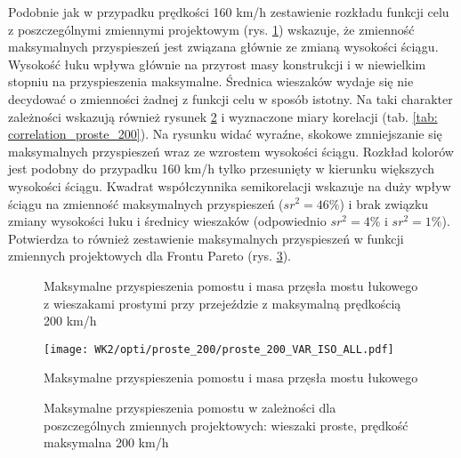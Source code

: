Podobnie jak w przypadku prędkości 160 km/h zestawienie rozkładu funkcji celu z poszczególnymi zmiennymi projektowym (rys. \ref{fig:wk2_opti_proste_200_variables}) wskazuje, że zmienność maksymalnych przyspieszeń jest związana głównie ze zmianą wysokości ściągu. Wysokość łuku wpływa głównie na przyrost masy konstrukcji i w niewielkim stopniu na przyspieszenia maksymalne. Średnica wieszaków wydaje się nie decydować o zmienności żadnej z funkcji celu w sposób istotny. Na taki charakter zależności wskazują również rysunek \ref{fig:wk2_opti_proste_200_vars_all} i wyznaczone miary korelacji (tab. \ref{tab: correlation_proste_200}). Na rysunku widać wyraźne, skokowe zmniejszanie się maksymalnych przyspieszeń wraz ze wzrostem wysokości ściągu. Rozkład kolorów jest podobny do przypadku 160 km/h tylko przesunięty w kierunku większych wysokości ściągu. Kwadrat współczynnika semikorelacji wskazuje na duży wpływ ściągu na zmienność maksymalnych przyspieszeń ($sr^2=46\%$) i brak związku zmiany wysokości łuku i średnicy wieszaków (odpowiednio $sr^2=4\%$ i $sr^2=1\%$). Potwierdza to również zestawienie maksymalnych przyspieszeń w funkcji zmiennych projektowych dla Frontu Pareto (rys. \ref{fig:wk2_opti_proste_200_var_2d}). 

\begin{figure}[hbt!]
	\centering
	\captionsetup{justification=centering}
	\caption{Maksymalne przyspieszenia pomostu i masa przęsła mostu łukowego z wieszakami prostymi przy przejeździe z maksymalną prędkością 200 km/h}
	\label{fig:wk2_opti_proste_200_variables}
\end{figure}

\begin{figure}[hbt!]
	\centering
	\texttt{[image: WK2/opti/proste\_200/proste\_200\_VAR\_ISO\_ALL.pdf]}
	\captionsetup{justification=centering}
	\caption{Maksymalne przyspieszenia pomostu i masa przęsła mostu łukowego }
	\label{fig:wk2_opti_proste_200_vars_all}
\end{figure}
\begin{figure}[hbt!]
	\centering
	\captionsetup{justification=centering}
	\caption{Maksymalne przyspieszenia pomostu w zależności dla poszczególnych zmiennych projektowych: wieszaki proste, prędkość maksymalna 200 km/h}
	\label{fig:wk2_opti_proste_200_var_2d}
\end{figure}


